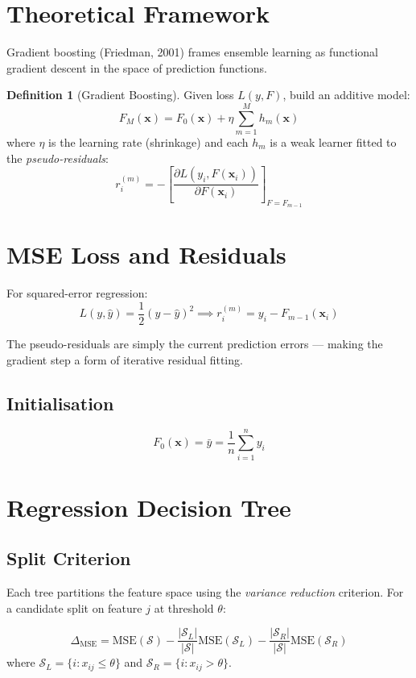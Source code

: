 \documentclass[12pt,a4paper]{report}
\newcommand{\vect}[1]{\bm{#1}}
\theoremstyle{definition}
\newtheorem{definition}{Definition}[chapter]
\begin{document}
\section{Theoretical Framework}

Gradient boosting (Friedman, 2001) frames ensemble learning as functional
gradient descent in the space of prediction functions.

\begin{definition}[Gradient Boosting]
Given loss $L(y, F)$, build an additive model:
\[
  F_M(\vect{x}) = F_0(\vect{x}) + \eta \sum_{m=1}^{M} h_m(\vect{x})
\]
where $\eta$ is the learning rate (shrinkage) and each $h_m$ is a weak learner
fitted to the \emph{pseudo-residuals}:
\[
  r_i^{(m)} = -\left[\frac{\partial L(y_i, F(\vect{x}_i))}{\partial F(\vect{x}_i)}\right]_{F = F_{m-1}}
\]
\end{definition}

\section{MSE Loss and Residuals}

For squared-error regression:
\[
  L(y, \hat{y}) = \frac{1}{2}(y - \hat{y})^2
  \implies r_i^{(m)} = y_i - F_{m-1}(\vect{x}_i)
\]

The pseudo-residuals are simply the current prediction errors — making the
gradient step a form of iterative residual fitting.

\subsection{Initialisation}

\[
  F_0(\vect{x}) = \bar{y} = \frac{1}{n}\sum_{i=1}^n y_i
\]

\section{Regression Decision Tree}

\subsection{Split Criterion}

Each tree partitions the feature space using the \emph{variance reduction}
criterion. For a candidate split on feature $j$ at threshold $\theta$:

\[
  \Delta_{\text{MSE}} = \text{MSE}(\mathcal{S})
    - \frac{|\mathcal{S}_L|}{|\mathcal{S}|}\text{MSE}(\mathcal{S}_L)
    - \frac{|\mathcal{S}_R|}{|\mathcal{S}|}\text{MSE}(\mathcal{S}_R)
\]
where $\mathcal{S}_L = \{i : x_{ij} \leq \theta\}$ and
$\mathcal{S}_R = \{i : x_{ij} > \theta\}$.
\end{document}
